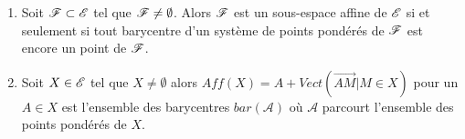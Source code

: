 \documentclass[a4paper,12pt]{article}
\begin{document}
\clearpage

\begin{theoreme}{}{}
    \begin{enumerate}
        \item Soit $\mathscr{F} \subset \mathscr{E}$ tel que $\mathscr{F} \neq \emptyset$. Alors $\mathscr{F}$ est un sous-espace affine de $\mathscr{E}$ si et seulement si tout barycentre d'un système de points pondérés de
        $\mathscr{F}$ est encore un point de $\mathscr{F}$.

        \item Soit $X \in \mathscr{E}$ tel que $X \neq \emptyset$ alors $Aff(X) = A + Vect(\overrightarrow{AM} | M \in X)$ pour un $A \in X$ est l'ensemble
        des barycentres $bar(\mathcal{A})$ où $\mathcal{A}$ parcourt l'ensemble des points pondérés de $X$.
    \end{enumerate}
\end{theoreme}
\end{document}

